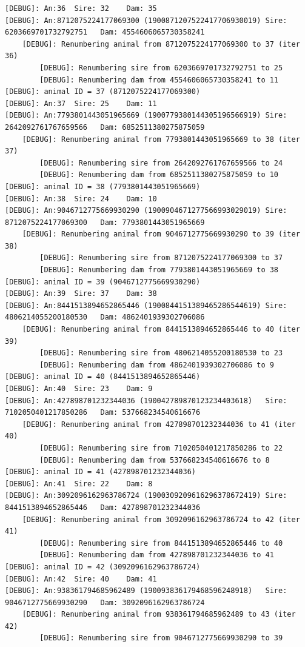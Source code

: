 \documentclass[
  letterpaper,
  DIV=11,
  numbers=noendperiod]{scrreprt}
\begin{document}
\begin{codelisting}
{\begin{verbatim}
[DEBUG]: An:36  Sire: 32    Dam: 35
[DEBUG]: An:8712075224177069300 (1900871207522417706930019) Sire: 6203669701732792751   Dam: 4554606065730358241
    [DEBUG]: Renumbering animal from 8712075224177069300 to 37 (iter 36)
        [DEBUG]: Renumbering sire from 6203669701732792751 to 25
        [DEBUG]: Renumbering dam from 4554606065730358241 to 11
[DEBUG]: animal ID = 37 (8712075224177069300)
[DEBUG]: An:37  Sire: 25    Dam: 11
[DEBUG]: An:7793801443051965669 (1900779380144305196566919) Sire: 2642092761767659566   Dam: 6852511380275875059
    [DEBUG]: Renumbering animal from 7793801443051965669 to 38 (iter 37)
        [DEBUG]: Renumbering sire from 2642092761767659566 to 24
        [DEBUG]: Renumbering dam from 6852511380275875059 to 10
[DEBUG]: animal ID = 38 (7793801443051965669)
[DEBUG]: An:38  Sire: 24    Dam: 10
[DEBUG]: An:9046712775669930290 (1900904671277566993029019) Sire: 8712075224177069300   Dam: 7793801443051965669
    [DEBUG]: Renumbering animal from 9046712775669930290 to 39 (iter 38)
        [DEBUG]: Renumbering sire from 8712075224177069300 to 37
        [DEBUG]: Renumbering dam from 7793801443051965669 to 38
[DEBUG]: animal ID = 39 (9046712775669930290)
[DEBUG]: An:39  Sire: 37    Dam: 38
[DEBUG]: An:8441513894652865446 (1900844151389465286544619) Sire: 4806214055200180530   Dam: 4862401939302706086
    [DEBUG]: Renumbering animal from 8441513894652865446 to 40 (iter 39)
        [DEBUG]: Renumbering sire from 4806214055200180530 to 23
        [DEBUG]: Renumbering dam from 4862401939302706086 to 9
[DEBUG]: animal ID = 40 (8441513894652865446)
[DEBUG]: An:40  Sire: 23    Dam: 9
[DEBUG]: An:427898701232344036 (190042789870123234403618)   Sire: 7102050401217850286   Dam: 537668234540616676
    [DEBUG]: Renumbering animal from 427898701232344036 to 41 (iter 40)
        [DEBUG]: Renumbering sire from 7102050401217850286 to 22
        [DEBUG]: Renumbering dam from 537668234540616676 to 8
[DEBUG]: animal ID = 41 (427898701232344036)
[DEBUG]: An:41  Sire: 22    Dam: 8
[DEBUG]: An:3092096162963786724 (1900309209616296378672419) Sire: 8441513894652865446   Dam: 427898701232344036
    [DEBUG]: Renumbering animal from 3092096162963786724 to 42 (iter 41)
        [DEBUG]: Renumbering sire from 8441513894652865446 to 40
        [DEBUG]: Renumbering dam from 427898701232344036 to 41
[DEBUG]: animal ID = 42 (3092096162963786724)
[DEBUG]: An:42  Sire: 40    Dam: 41
[DEBUG]: An:938361794685962489 (190093836179468596248918)   Sire: 9046712775669930290   Dam: 3092096162963786724
    [DEBUG]: Renumbering animal from 938361794685962489 to 43 (iter 42)
        [DEBUG]: Renumbering sire from 9046712775669930290 to 39

\end{verbatim}}
\end{codelisting}
\end{document}
